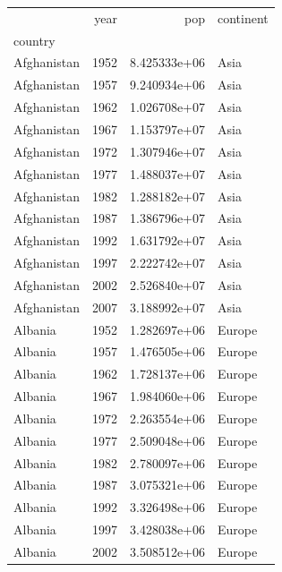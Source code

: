 \documentclass[
  letterpaper,
  DIV=11,
  numbers=noendperiod]{scrreprt}
\begin{document}
\begin{tcolorbox}
\begin{tabular}{lrrl}
\toprule
{} &  year &           pop & continent \\
country                  &       &               &           \\
\midrule
Afghanistan              &  1952 &  8.425333e+06 &      Asia \\
Afghanistan              &  1957 &  9.240934e+06 &      Asia \\
Afghanistan              &  1962 &  1.026708e+07 &      Asia \\
Afghanistan              &  1967 &  1.153797e+07 &      Asia \\
Afghanistan              &  1972 &  1.307946e+07 &      Asia \\
Afghanistan              &  1977 &  1.488037e+07 &      Asia \\
Afghanistan              &  1982 &  1.288182e+07 &      Asia \\
Afghanistan              &  1987 &  1.386796e+07 &      Asia \\
Afghanistan              &  1992 &  1.631792e+07 &      Asia \\
Afghanistan              &  1997 &  2.222742e+07 &      Asia \\
Afghanistan              &  2002 &  2.526840e+07 &      Asia \\
Afghanistan              &  2007 &  3.188992e+07 &      Asia \\
Albania                  &  1952 &  1.282697e+06 &    Europe \\
Albania                  &  1957 &  1.476505e+06 &    Europe \\
Albania                  &  1962 &  1.728137e+06 &    Europe \\
Albania                  &  1967 &  1.984060e+06 &    Europe \\
Albania                  &  1972 &  2.263554e+06 &    Europe \\
Albania                  &  1977 &  2.509048e+06 &    Europe \\
Albania                  &  1982 &  2.780097e+06 &    Europe \\
Albania                  &  1987 &  3.075321e+06 &    Europe \\
Albania                  &  1992 &  3.326498e+06 &    Europe \\
Albania                  &  1997 &  3.428038e+06 &    Europe \\
Albania                  &  2002 &  3.508512e+06 &    Europe \\

\end{tabular}
\end{tcolorbox}
\end{document}
